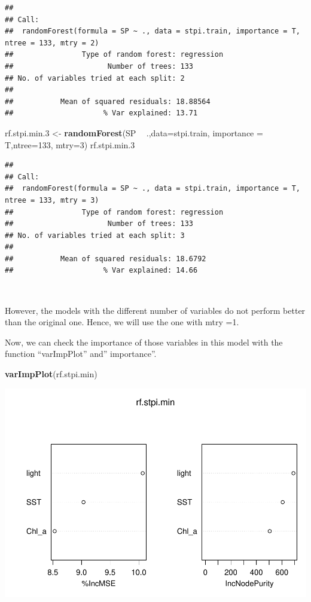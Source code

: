 \documentclass[
]{article}
\newenvironment{Shaded}{\begin{snugshade}}{\end{snugshade}}
\newcommand{\DataTypeTok}[1]{\textcolor[rgb]{0.13,0.29,0.53}{#1}}
\newcommand{\DecValTok}[1]{\textcolor[rgb]{0.00,0.00,0.81}{#1}}
\newcommand{\FloatTok}[1]{\textcolor[rgb]{0.00,0.00,0.81}{#1}}
\newcommand{\KeywordTok}[1]{\textcolor[rgb]{0.13,0.29,0.53}{\textbf{#1}}}
\newcommand{\NormalTok}[1]{#1}
\newcommand{\OperatorTok}[1]{\textcolor[rgb]{0.81,0.36,0.00}{\textbf{#1}}}
\newcommand{\StringTok}[1]{\textcolor[rgb]{0.31,0.60,0.02}{#1}}
\begin{document}
\begin{verbatim}
## 
## Call:
##  randomForest(formula = SP ~ ., data = stpi.train, importance = T,      ntree = 133, mtry = 2) 
##                Type of random forest: regression
##                      Number of trees: 133
## No. of variables tried at each split: 2
## 
##           Mean of squared residuals: 18.88564
##                     % Var explained: 13.71
\end{verbatim}

\begin{Shaded}
\begin{Highlighting}[]
\NormalTok{rf.stpi.min}\FloatTok{.3}\NormalTok{ <-}\StringTok{ }\KeywordTok{randomForest}\NormalTok{(SP }\OperatorTok{~}\StringTok{ }\NormalTok{.,}\DataTypeTok{data=}\NormalTok{stpi.train, }\DataTypeTok{importance =}\NormalTok{ T,}\DataTypeTok{ntree=}\DecValTok{133}\NormalTok{, }\DataTypeTok{mtry=}\DecValTok{3}\NormalTok{)}
\NormalTok{rf.stpi.min}\FloatTok{.3}
\end{Highlighting}
\end{Shaded}

\begin{verbatim}
## 
## Call:
##  randomForest(formula = SP ~ ., data = stpi.train, importance = T,      ntree = 133, mtry = 3) 
##                Type of random forest: regression
##                      Number of trees: 133
## No. of variables tried at each split: 3
## 
##           Mean of squared residuals: 18.6792
##                     % Var explained: 14.66
\end{verbatim}

~

However, the models with the different number of variables do not
perform better than the original one. Hence, we will use the one with
mtry =1.

Now, we can check the importance of those variables in this model with
the function ``varImpPlot'' and'' importance''.

\begin{Shaded}
\begin{Highlighting}[]
\KeywordTok{varImpPlot}\NormalTok{(rf.stpi.min)}
\end{Highlighting}
\end{Shaded}

\includegraphics{index_files/figure-latex/unnamed-chunk-10-1.pdf}
\end{document}
